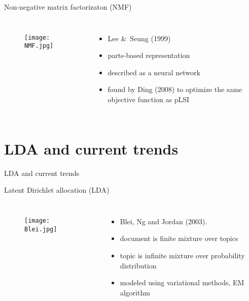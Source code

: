 \documentclass{beamer}
\begin{document}
\begin{frame}{Non-negative matrix factorizaton (NMF)}
\begin{columns}
\begin{figure}[htb!]
\texttt{[image: NMF.jpg]}
\end{figure}
\begin{itemize}
\item Lee \&\ Seung (1999)
\item parts-based representation
\item described as a neural network
\item found by Ding (2008) to optimize the same objective function as pLSI
\end{itemize}
\end{columns}
\end{frame}

\section{LDA and current trends}
\begin{frame}{LDA and current trends}
\end{frame}

\begin{frame}{Latent Dirichlet allocation (LDA)}
\begin{columns}
\begin{figure}[htb!]
\texttt{[image: Blei.jpg]}
\end{figure}
\begin{itemize}
\item Blei, Ng and Jordan (2003).
\item document is finite mixture over topics
\item topic is infinite mixture over probability distribution
\item modeled using variational methods, EM algorithm
\end{itemize}
\end{columns}
\end{frame}

\end{document}

